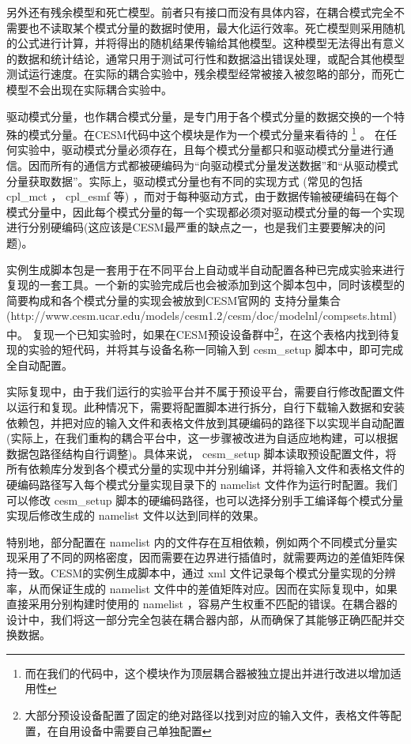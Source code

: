 另外还有残余模型和死亡模型。前者只有接口而没有具体内容，在耦合模式完全不需要也不读取某个模式分量的数据时使用，最大化运行效率。死亡模型则采用随机的公式进行计算，并将得出的随机结果传输给其他模型。这种模型无法得出有意义的数据和统计结论，通常只用于测试可行性和数据溢出错误处理，或配合其他模型测试运行速度。在实际的耦合实验中，残余模型经常被接入被忽略的部分，而死亡模型不会出现在实际耦合实验中。

驱动模式分量，也作耦合模式分量，是专门用于各个模式分量的数据交换的一个特殊的模式分量。在CESM代码中这个模块是作为一个模式分量来看待的
\footnote {而在我们的代码中，这个模块作为顶层耦合器被独立提出并进行改进以增加适用性}
。
在任何实验中，驱动模式分量必须存在，且每个模式分量都只和驱动模式分量进行通信。因而所有的通信方式都被硬编码为“向驱动模式分量发送数据”和“从驱动模式分量获取数据”。实际上，驱动模式分量也有不同的实现方式
(常见的包括 cpl\_mct ， cpl\_esmf 等)
，而对于每种驱动方式，由于数据传输被硬编码在每个模式分量中，因此每个模式分量的每一个实现都必须对驱动模式分量的每一个实现进行分别硬编码(这应该是CESM最严重的缺点之一，也是我们主要要解决的问题)。

实例生成脚本包是一套用于在不同平台上自动或半自动配置各种已完成实验来进行复现的一套工具。一个新的实验完成后也会被添加到这个脚本包中，同时该模型的简要构成和各个模式分量的实现会被放到CESM官网的
支持分量集合
(http://www.cesm.ucar.edu/models/cesm1.2/cesm/doc/modelnl/compsets.html)
中。
复现一个已知实验时，如果在CESM预设设备群中\footnote{大部分预设设备配置了固定的绝对路径以找到对应的输入文件，表格文件等配置，在自用设备中需要自己单独配置}，在这个表格内找到待复现的实验的短代码，并将其与设备名称一同输入到 cesm\_setup 脚本中，即可完成全自动配置。

实际复现中，由于我们运行的实验平台并不属于预设平台，需要自行修改配置文件以运行和复现。此种情况下，需要将配置脚本进行拆分，自行下载输入数据和安装依赖包，并把对应的输入文件和表格文件放到其硬编码的路径下以实现半自动配置(实际上，在我们重构的耦合平台中，这一步骤被改进为自适应地构建，可以根据数据包路径结构自行调整)。具体来说， cesm\_setup 脚本读取预设配置文件，将所有依赖库分发到各个模式分量的实现中并分别编译，并将输入文件和表格文件的硬编码路径写入每个模式分量实现目录下的 namelist 文件作为运行时配置。我们可以修改 cesm\_setup 脚本的硬编码路径，也可以选择分别手工编译每个模式分量实现后修改生成的 namelist 文件以达到同样的效果。

特别地，部分配置在 namelist 内的文件存在互相依赖，例如两个不同模式分量实现采用了不同的网格密度，因而需要在边界进行插值时，就需要两边的差值矩阵保持一致。CESM的实例生成脚本中，通过 xml 文件记录每个模式分量实现的分辨率，从而保证生成的 namelist 文件中的差值矩阵对应。因而在实际复现中，如果直接采用分别构建时使用的 namelist ，容易产生权重不匹配的错误。在耦合器的设计中，我们将这一部分完全包装在耦合器内部，从而确保了其能够正确匹配并交换数据。

